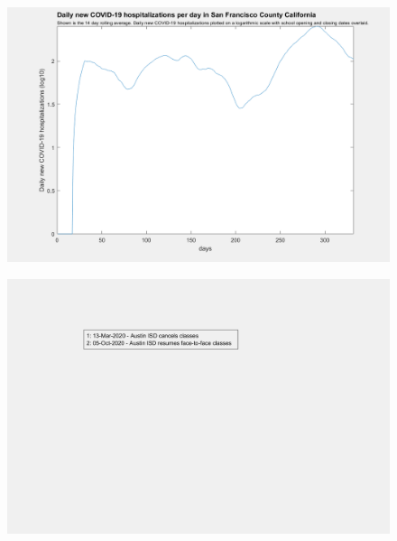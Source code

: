 \documentclass[]{article}
\begin{document}
\begin{figure}[!h]
	\includegraphics[width=\linewidth]{images/san_francisco_hospitalizations_school_log.png}
	\caption{}
	\label{fig:images/san_francisco_hospitalizations_school_logLabel}
\end{figure}

\begin{figure}[!h]
	\includegraphics[width=\linewidth]{legends/travis_school_legend.png}
	\caption{}
	\label{fig:legends/travis_school_legendLabel}
\end{figure}
\end{document}

